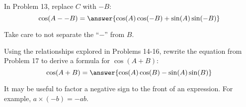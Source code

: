 \documentclass[number]{ximera}
\begin{document}
\begin{problem}
In Problem 13, replace $C$ with $-B$:
\[\cos(A--B)= \answer{\cos(A)\cos(-B)+\sin(A)\sin(-B)}\]
\begin{hint}
Take care to not separate the ``$-$'' from $B$.
\end{hint}

\end{problem}

\begin{problem}
Using the relationships explored in Problems 14-16, rewrite the equation from Problem 17 to derive a formula for $\cos(A+B)$:
\[\cos(A+B)=\answer{\cos(A)\cos(B)-\sin(A)\sin(B)}\]
\begin{hint}
It may be useful to factor a negative sign to the front of an expression. For example, $a \times (-b) = -ab$.
\end{hint}

\end{problem}
\end{document}
